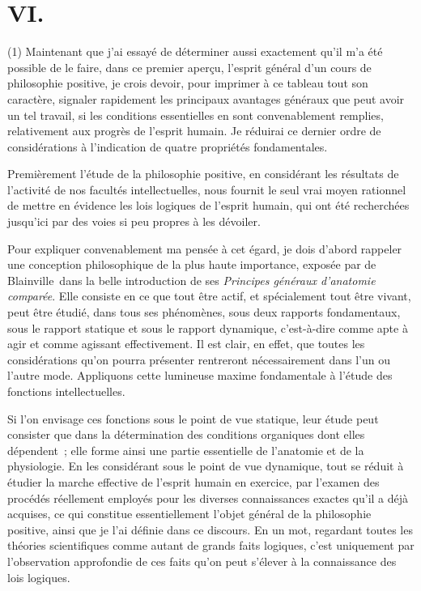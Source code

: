 \documentclass[french,twoside]{book} %
\begin{document}
\section[{VI.}]{VI.}
\noindent (1) Maintenant que j’ai essayé de déterminer aussi exactement qu’il m’a été possible de le faire, dans ce premier aperçu, l’esprit général d’un cours de philosophie positive, je crois devoir, pour imprimer à ce tableau tout son caractère, signaler rapidement les principaux avantages généraux que peut avoir un tel travail, si les conditions essentielles en sont convenablement remplies, relativement aux progrès de l’esprit humain. Je réduirai ce dernier ordre de considérations à l’indication de quatre propriétés fondamentales.\par
Premièrement l’étude de la philosophie positive, en considérant les résultats de l’activité de nos facultés intellectuelles, nous fournit le seul vrai moyen rationnel de mettre en évidence les lois logiques de l’esprit humain, qui ont été recherchées jusqu’ici par des voies si peu propres à les dévoiler.\par
Pour expliquer convenablement ma pensée à cet égard, je dois d’abord rappeler une conception philosophique de la plus haute importance, exposée par de Blainville dans la belle introduction de ses \emph{Principes généraux d’anatomie comparée}. Elle consiste en ce que tout être actif, et spécialement tout être vivant, peut être étudié, dans tous ses phénomènes, sous deux rapports fondamentaux, sous le rapport statique et sous le rapport dynamique, c’est-à-dire comme apte à agir et comme agissant effectivement. Il est clair, en effet, que toutes les considérations qu’on pourra présenter rentreront nécessairement dans l’un ou l’autre mode. Appliquons cette lumineuse maxime fondamentale à l’étude des fonctions intellectuelles.\par
Si l’on envisage ces fonctions sous le point de vue statique, leur étude peut consister que dans la détermination des conditions organiques dont elles dépendent ; elle forme ainsi une partie essentielle de l’anatomie et de la physiologie. En les considérant sous le point de vue dynamique, tout se réduit à étudier la marche effective de l’esprit humain en exercice, par l’examen des procédés réellement employés pour les diverses connaissances exactes qu’il a déjà acquises, ce qui constitue essentiellement l’objet général de la philosophie positive, ainsi que je l’ai définie dans ce discours. En un mot, regardant toutes les théories scientifiques comme autant de grands faits logiques, c’est uniquement par l’observation approfondie de ces faits qu’on peut s’élever à la connaissance des lois logiques.\par
\end{document}
